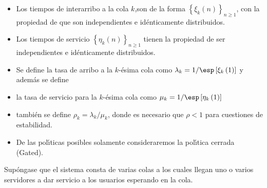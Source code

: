 \begin{itemize}
\item Los tiempos de interarribo a la cola $k$,son de la forma
$\left\{\xi_{k}\left(n\right)\right\}_{n\geq1}$, con la propiedad
de que son independientes e id{\'e}nticamente distribuidos.

\item Los tiempos de servicio
$\left\{\eta_{k}\left(n\right)\right\}_{n\geq1}$ tienen la
propiedad de ser independientes e id{\'e}nticamente distribuidos.

\item Se define la tasa de arribo a la $k$-{\'e}sima cola como
$\lambda_{k}=1/\esp\left[\xi_{k}\left(1\right)\right]$ y
adem{\'a}s se define

\item la tasa de servicio para la $k$-{\'e}sima cola como
$\mu_{k}=1/\esp\left[\eta_{k}\left(1\right)\right]$

\item tambi{\'e}n se define $\rho_{k}=\lambda_{k}/\mu_{k}$, donde
es necesario que $\rho<1$ para cuestiones de estabilidad.

\item De las pol{\'\i}ticas posibles solamente consideraremos la
pol{\'\i}tica cerrada (Gated).
\end{itemize}




Sup\'ongase que el sistema consta de varias colas a los cuales
llegan uno o varios servidores a dar servicio a los usuarios
esperando en la cola.\\


